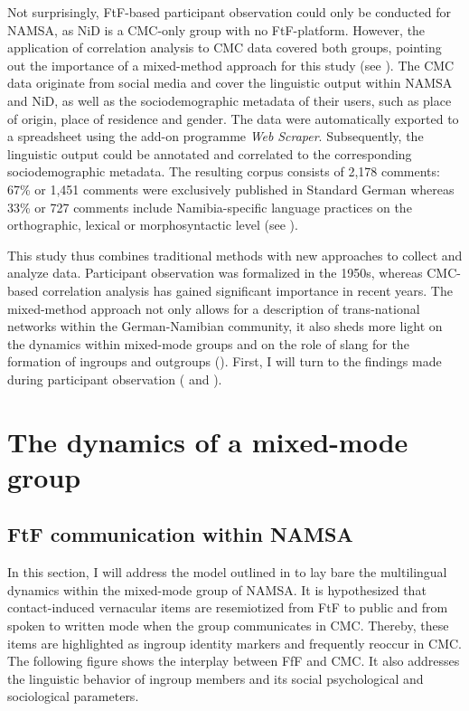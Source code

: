 \documentclass[output=paper]{langsci/langscibook}
\begin{document}
Not surprisingly, FtF-based participant observation could only be conducted for NAMSA, as NiD is a CMC-only group with no FtF-platform. However, the application of correlation analysis to CMC data covered both groups, pointing out the importance of a mixed-method approach for this study (see ). The CMC data originate from social media and cover the linguistic output within NAMSA and NiD, as well as the sociodemographic metadata of their users, such as place of origin, place of residence and gender. The data were automatically exported to a spreadsheet using the add-on programme \textit{Web} \textit{Scraper}. Subsequently, the linguistic output could be annotated and correlated to the corresponding sociodemographic metadata. The resulting corpus consists of 2,178 comments: 67\% or 1,451 comments were exclusively published in Standard German whereas 33\% or 727 comments include Namibia-specific language practices on the orthographic, lexical or morphosyntactic level (see \citealt{radke_urban_inpress}).

This study thus combines traditional methods with new approaches to collect and analyze data. Participant observation was formalized in the 1950s, whereas CMC-based correlation analysis has gained significant importance in recent years. The mixed-method approach not only allows for a description of trans-national networks within the German-Namibian community, it also sheds more light on the dynamics within mixed-mode groups and on the role of slang for the formation of ingroups and outgroups (). First, I will turn to the findings made during participant observation ( and ). 

 
 \section{The dynamics of a mixed-mode group} 
 \label{sec:radke:3}

 
\subsection{FtF communication within NAMSA}
 \label{sec:radke:3.1}
 

In this section, I will address the model outlined in  to lay bare the multilingual dynamics within the mixed-mode group of NAMSA. It is hypothesized that contact-induced vernacular items are resemiotized from FtF to public and from spoken to written mode when the group communicates in CMC. Thereby, these items are highlighted as ingroup identity markers and frequently reoccur in CMC. The following figure shows the interplay between FfF and CMC. It also addresses the linguistic behavior of ingroup members and its social psychological and sociological parameters. 
\end{document}
